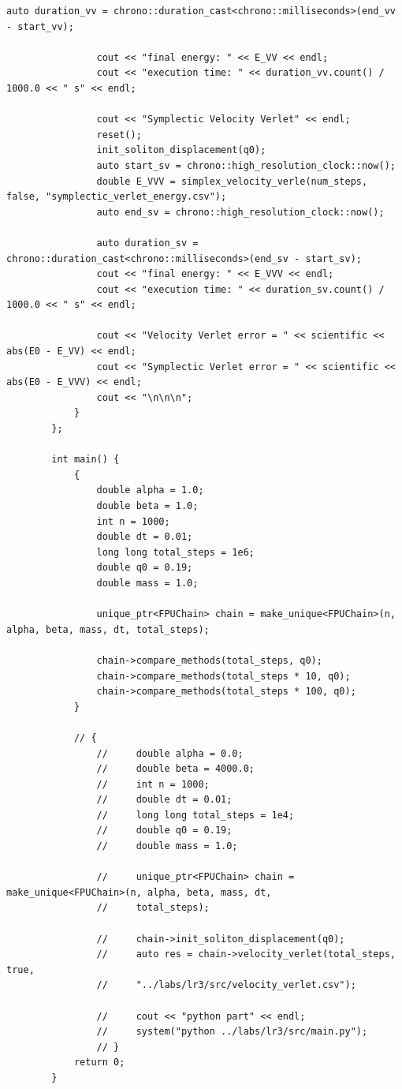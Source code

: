 \documentclass[14pt,a4paper]{extarticle}
\theoremstyle{plain}
\begin{document}
\begin{lstlisting}[title=main.cpp, gobble=16, breaklines=true, breakatwhitespace=true]
				auto duration_vv = chrono::duration_cast<chrono::milliseconds>(end_vv - start_vv);
				
				cout << "final energy: " << E_VV << endl;
				cout << "execution time: " << duration_vv.count() / 1000.0 << " s" << endl;
				
				cout << "Symplectic Velocity Verlet" << endl;
				reset();
				init_soliton_displacement(q0);
				auto start_sv = chrono::high_resolution_clock::now();
				double E_VVV = simplex_velocity_verle(num_steps, false, "symplectic_verlet_energy.csv");
				auto end_sv = chrono::high_resolution_clock::now();
				
				auto duration_sv = chrono::duration_cast<chrono::milliseconds>(end_sv - start_sv);
				cout << "final energy: " << E_VVV << endl;
				cout << "execution time: " << duration_sv.count() / 1000.0 << " s" << endl;
				
				cout << "Velocity Verlet error = " << scientific << abs(E0 - E_VV) << endl;
				cout << "Symplectic Verlet error = " << scientific << abs(E0 - E_VVV) << endl;
				cout << "\n\n\n";
			}
		};
		
		int main() {
			{
				double alpha = 1.0;
				double beta = 1.0;
				int n = 1000;
				double dt = 0.01;
				long long total_steps = 1e6;
				double q0 = 0.19;
				double mass = 1.0;
				
				unique_ptr<FPUChain> chain = make_unique<FPUChain>(n, alpha, beta, mass, dt, total_steps);
				
				chain->compare_methods(total_steps, q0);
				chain->compare_methods(total_steps * 10, q0);
				chain->compare_methods(total_steps * 100, q0);
			}
			
			// {
				//     double alpha = 0.0;
				//     double beta = 4000.0;
				//     int n = 1000;
				//     double dt = 0.01;
				//     long long total_steps = 1e4;
				//     double q0 = 0.19;
				//     double mass = 1.0;
				
				//     unique_ptr<FPUChain> chain = make_unique<FPUChain>(n, alpha, beta, mass, dt,
				//     total_steps);
				
				//     chain->init_soliton_displacement(q0);
				//     auto res = chain->velocity_verlet(total_steps, true,
				//     "../labs/lr3/src/velocity_verlet.csv");
				
				//     cout << "python part" << endl;
				//     system("python ../labs/lr3/src/main.py");
				// }
			return 0;
		}
	\end{lstlisting}
	
\end{document}
